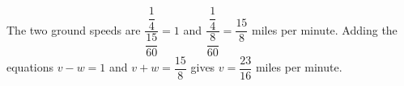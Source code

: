 The two ground speeds are $\dfrac{\dfrac{1}{4}}{\dfrac{15}{60}}=1$ and $\dfrac{\dfrac{1}{4}}{\dfrac{8}{60}}=\dfrac{15}{8}$ miles per minute. Adding the equations $v-w=1$ and $v+w=\dfrac{15}{8}$ gives $\boxed{v=\dfrac{23}{16}}$ miles per minute.
